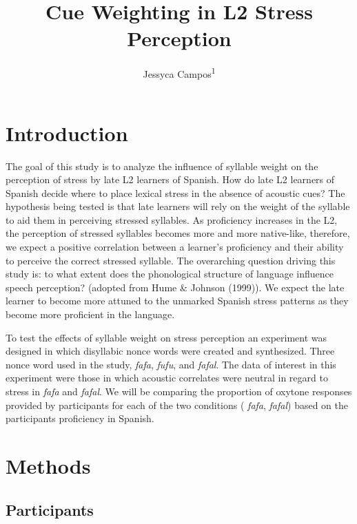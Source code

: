 \documentclass[man]{apa6}
\title{Cue Weighting in L2 Stress Perception}
\author{Jessyca Campos\textsuperscript{1}}
\affiliation{
    \vspace{0.5cm}
          \textsuperscript{1} Rutgers University\\
          \textsuperscript{}   }
\theoremstyle{definition}
\theoremstyle{definition}
\theoremstyle{definition}
\theoremstyle{remark}
\begin{document}
\maketitle

\setcounter{secnumdepth}{0}



\section{Introduction}\label{introduction}

The goal of this study is to analyze the influence of syllable weight on
the perception of stress by late L2 learners of Spanish. How do late L2
learners of Spanish decide where to place lexical stress in the absence
of acoustic cues? The hypothesis being tested is that late learners will
rely on the weight of the syllable to aid them in perceiving stressed
syllables. As proficiency increases in the L2, the perception of
stressed syllables becomes more and more native-like, therefore, we
expect a positive correlation between a learner's proficiency and their
ability to perceive the correct stressed syllable. The overarching
question driving this study is: to what extent does the phonological
structure of language influence speech perception? (adopted from Hume \&
Johnson (1999)). We expect the late learner to become more attuned to
the unmarked Spanish stress patterns as they become more proficient in
the language.

To test the effects of syllable weight on stress perception an
experiment was designed in which disyllabic nonce words were created and
synthesized. Three nonce word used in the study, \emph{fafa},
\emph{fufu}, and \emph{fafal}. The data of interest in this experiment
were those in which acoustic correlates were neutral in regard to stress
in \emph{fafa} and \emph{fafal}. We will be comparing the proportion of
oxytone responses provided by participants for each of the two
conditions ( \emph{fafa}, \emph{fafal}) based on the participants
proficiency in Spanish.

\section{Methods}\label{methods}

\subsection{Participants}\label{participants}
\end{document}
